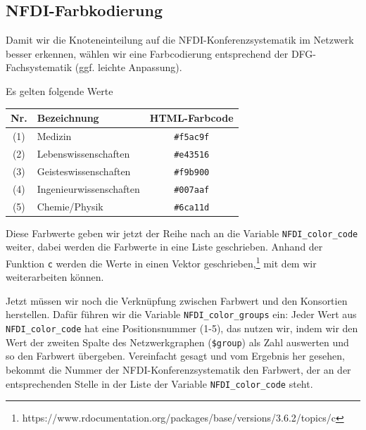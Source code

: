 \documentclass[11pt]{article}
\begin{document}
    \hypertarget{nfdi-farbkodierung}{%
\subsection{NFDI-Farbkodierung}\label{nfdi-farbkodierung}}

Damit wir die Knoteneinteilung auf die NFDI-Konferenzsystematik im
Netzwerk besser erkennen, wählen wir eine Farbcodierung entsprechend der
DFG-Fachsystematik (ggf. leichte Anpassung).

Es gelten folgende Werte

\begin{longtable}[]{@{}clc@{}}
\toprule
Nr. & Bezeichnung & HTML-Farbcode\tabularnewline
\midrule
\endhead
(1) & Medizin & \texttt{\#f5ac9f}\tabularnewline
(2) & Lebenswissenschaften & \texttt{\#e43516}\tabularnewline
(3) & Geisteswissenschaften & \texttt{\#f9b900}\tabularnewline
(4) & Ingenieurwissenschaften & \texttt{\#007aaf}\tabularnewline
(5) & Chemie/Physik & \texttt{\#6ca11d}\tabularnewline
\bottomrule
\end{longtable}

Diese Farbwerte geben wir jetzt der Reihe nach an die Variable
\texttt{NFDI\_color\_code} weiter, dabei werden die Farbwerte in eine
Liste geschrieben. Anhand der Funktion \texttt{c} werden die Werte in
einen Vektor geschrieben,\footnote{https://www.rdocumentation.org/packages/base/versions/3.6.2/topics/c}
mit dem wir weiterarbeiten können.

Jetzt müssen wir noch die Verknüpfung zwischen Farbwert und den
Konsortien herstellen. Dafür führen wir die Variable
\texttt{NFDI\_color\_groups} ein: Jeder Wert aus
\texttt{NFDI\_color\_code} hat eine Positionsnummer (1-5), das nutzen
wir, indem wir den Wert der zweiten Spalte des Netzwerkgraphen
(\texttt{\$group}) als Zahl auswerten und so den Farbwert übergeben.
Vereinfacht gesagt und vom Ergebnis her gesehen, bekommt die Nummer der
NFDI-Konferenzsystematik den Farbwert, der an der entsprechenden Stelle
in der Liste der Variable \texttt{NFDI\_color\_code} steht.
\end{document}
